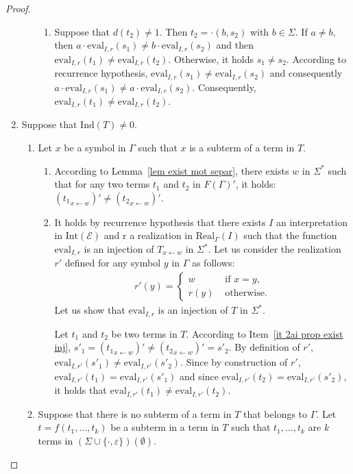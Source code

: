 \documentclass[a4paper]{llncs}
\begin{document}
\begin{proof}
\begin{enumerate}
\begin{enumerate}
\begin{enumerate}
        \item Suppose that $d(t_2)\neq 1$. Then $t_2=\cdot(b,s_2)$ with $b\in\Sigma$. 
    If $a\neq b$, then $a\cdot \mathrm{eval}_{I,r}(s_1)\neq b\cdot \mathrm{eval}_{I,r}(s_2)$ and then $\mathrm{eval}_{I,r}(t_1)\neq \mathrm{eval}_{I,r}(t_2)$.
    Otherwise, it holds $s_1\neq s_2$. According to recurrence hypothesis, $\mathrm{eval}_{I,r}(s_1)\neq\mathrm{eval}_{I,r}(s_2)$ and consequently $a\cdot \mathrm{eval}_{I,r}(s_1)\neq a\cdot \mathrm{eval}_{I,r}(s_2)$. Consequently, $\mathrm{eval}_{I,r}(t_1)\neq \mathrm{eval}_{I,r}(t_2)$.
      \end{enumerate}
    \end{enumerate}
    
    \item Suppose that $\mathrm{Ind}(T)\neq 0$.
    
    \begin{enumerate}
      \item Let $x$ be a symbol in $\Gamma$ such that $x$ is a subterm of a term in $T$. 
    
      \begin{enumerate}
        \item\label{it 2ai prop exist inj} According to Lemma~\ref{lem exist mot separ}, there exists $w$ in $\Sigma^*$ such that for any two terms $t_1$ and $t_2$ in $F(\Gamma)'$, it holds: $({t_1}_{x\leftarrow w})'\neq({t_2}_{x\leftarrow w})'$.

        \item It holds by recurrence hypothesis that there exists $I$ an interpretation in $\mathrm{Int}(\mathcal{E})$ and $\mathrm{r}$ a realization in $\mathrm{Real}_\Gamma(I)$ such that the function $\mathrm{eval}_{I,r}$ is an injection of $T_{x\leftarrow w}$ in $\Sigma^*$. Let us consider the realization $r'$ defined for any symbol $y$ in $\Gamma$ as follows:
        \begin{align*}
        r'(y)=
        \begin{cases}
            w & \text{ if }x=y,\\
            r(y) & \text{ otherwise}.
          \end{cases}
        \end{align*}
    Let us show that $\mathrm{eval}_{I,r}$ is an injection of $T$ in $\Sigma^*$. 
    
    Let $t_1$ and $t_2$ be two terms in $T$. According to Item~\ref{it 2ai prop exist inj}, $s'_1=({t_1}_{x\leftarrow w})'\neq ({t_2}_{x\leftarrow w})'=s'_2$. By definition of $r'$, $\mathrm{eval}_{I,r'}(s'_1)\neq \mathrm{eval}_{I,r'}(s'_2)$. Since by construction of $r'$, $\mathrm{eval}_{I,r'}(t_1)= \mathrm{eval}_{I,r'}(s'_1)$ and since $\mathrm{eval}_{I,r'}(t_2)= \mathrm{eval}_{I,r'}(s'_2)$, it holds that $\mathrm{eval}_{I,r'}(t_1)\neq \mathrm{eval}_{I,r'}(t_2)$.
    \end{enumerate}
    \item Suppose that there is no subterm of a term in $T$ that belongs to $\Gamma$. Let $t=f(t_1,\ldots,t_k)$ be a subterm in a term in $T$ such that $t_1,\ldots,t_k$ are $k$ terms in $(\Sigma\cup\{\cdot,\varepsilon\})(\emptyset)$.  
    

\end{enumerate}
\end{enumerate}
\end{proof}
\end{document}
